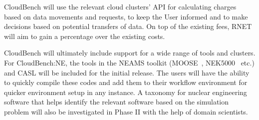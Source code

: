 
CloudBench will use the relevant 
cloud clusters' API for calculating charges based on data movements and 
requests, to keep the User informed and to make decisions based on potential 
transfers of data. On top of the existing fees, RNET will aim to gain a
percentage over the existing costs.%



CloudBench will ultimately include support for a wide range of tools and clusters. For CloudBench:NE, the tools in the NEAMS 
toolkit (MOOSE~\cite{moose}, NEK5000~\cite{nek5000} etc.) and CASL will be included for the initial release. The 
users will have the ability to quickly compile these codes and add them to 
their workflow environment for quicker environment setup in any instance. A taxonomy 
for nuclear engineering software that helps identify the relevant software 
based on the simulation problem will also be investigated in Phase II with the 
help of domain scientists.

